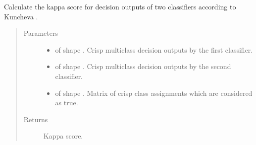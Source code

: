 \documentclass[letterpaper,10pt,english]{sphinxmanual}
\begin{document}

\begin{fulllineitems}
\label{\detokenize{pusion.evaluation.evaluation_metrics:pusion.evaluation.evaluation_metrics.kappa_statistic}}
\sphinxAtStartPar
Calculate the kappa score for decision outputs of two classifiers according to Kuncheva
\sphinxfootnotemark[2].
\begin{quote}\begin{description}
\item[{Parameters}] \leavevmode\begin{itemize}
\item {} 
\sphinxAtStartPar
{} \textendash{}  of shape .
Crisp multiclass decision outputs by the first classifier.

\item {} 
\sphinxAtStartPar
{} \textendash{}  of shape .
Crisp multiclass decision outputs by the second classifier.

\item {} 
\sphinxAtStartPar
{} \textendash{}  of shape .
Matrix of crisp class assignments which are considered as true.

\end{itemize}

\item[{Returns}] \leavevmode
\sphinxAtStartPar
Kappa score.

\end{description}\end{quote}

\end{fulllineitems}

\end{document}
